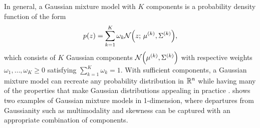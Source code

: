 In general, a Gaussian mixture model with \(K\) components is a probability density function of the form
\[
	p(z) = \sum_{k=1}^{K}{\omega_k \mathcal{N}\!\left(z;\, \mu^{(k)}, \Sigma^{(k)}\right)},
\]
which consists of \(K\) Gaussian components \(\mathcal{N}\!\left(\mu^{(k)}, \Sigma^{(k)}\right)\) with respective weights \(\omega_1, \dotsc, \omega_K \geq 0\) satisfying \(\sum_{k=1}^{K}\omega_k = 1\).
With sufficient components, a Gaussian mixture model can recreate any probability distribution in \(\mathbb{R}^n\) while having many of the properties that make Gaussian distributions appealing in practice \citep{McLachlanEtAl_2019_FiniteMixtureModels}.
 shows two examples of Gaussian mixture models in 1-dimension, where departures from Gaussianity such as multimodality and skewness can be captured with an appropriate combination of components.








